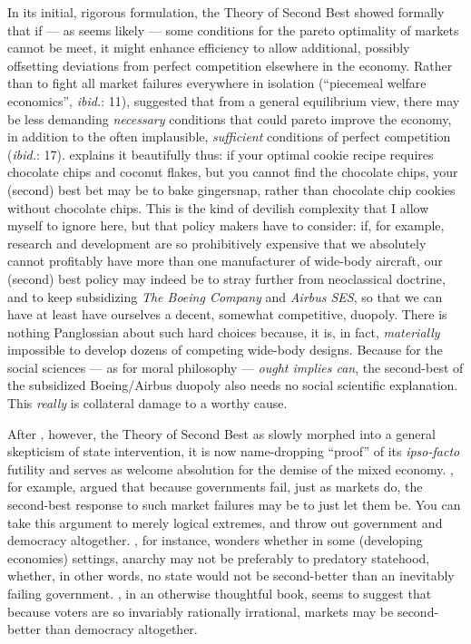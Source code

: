 \documentclass[11pt,a4paper,oneside,openright]{article}
\begin{document}
In its initial, rigorous formulation, the Theory of Second Best showed formally that if --- as seems likely --- some conditions for the pareto optimality of markets cannot be meet, it might enhance efficiency to allow additional, possibly offsetting deviations from perfect competition elsewhere in the economy. 
Rather than to fight all market failures everywhere in isolation (``piecemeal welfare economics'', \emph{ibid.}: 11), \citeauthor{Lancaster1956} suggested that from a general equilibrium view, there may be less demanding \emph{necessary} conditions that could pareto improve the economy, in addition to the often implausible, \emph{sufficient} conditions of perfect competition (\emph{ibid.}: 17). 
 \cite{TheEconomist2007} explains it beautifully thus: 
 if your optimal cookie recipe requires chocolate chips and coconut flakes, but you cannot find the chocolate chips, your (second) best bet may be to bake gingersnap, rather than chocolate chip cookies without chocolate chips. 
 This is the kind of devilish complexity that I allow myself to ignore here, but that policy makers have to consider: 
 if, for example, research and development are so prohibitively expensive that we absolutely cannot profitably have more than one manufacturer of wide-body aircraft, our (second) best policy may indeed be to stray further from neoclassical doctrine, and to keep subsidizing \emph{The Boeing Company} and \emph{Airbus SES}, so that we can have at least have ourselves a decent, somewhat competitive, duopoly. 
 There is nothing Panglossian about such hard choices because, it is, in fact, \emph{materially} impossible to develop dozens of competing wide-body designs. 
 Because for the social sciences --- as for moral philosophy --- \emph{ought implies can}, the second-best of the subsidized Boeing/Airbus duopoly also needs no social scientific explanation. 
 This \emph{really} is collateral damage to a worthy cause.

After \citeyear{Lancaster1956}, however, the Theory of Second Best as slowly morphed into a general skepticism of state intervention, it is now name-dropping ``proof'' of its \emph{ipso-facto} futility and serves as welcome absolution for the demise of the mixed economy. 
\citeauthor{Wolf1987,Wolf1979}, for example, argued that because governments fail, just as markets do, the second-best response to such market failures may be to just let them be. 
You can take this argument to merely logical extremes, and throw out government and democracy altogether. 
\cite{Leeson2009}, for instance, wonders whether in some (developing economies) settings, anarchy may not be preferably to predatory statehood, whether, in other words, no state would not be second-better than an inevitably failing government. 
\cite{Caplan2007}, in an otherwise thoughtful book, seems to suggest that because voters are so invariably rationally irrational, markets may be second-better than democracy altogether.
\end{document}
